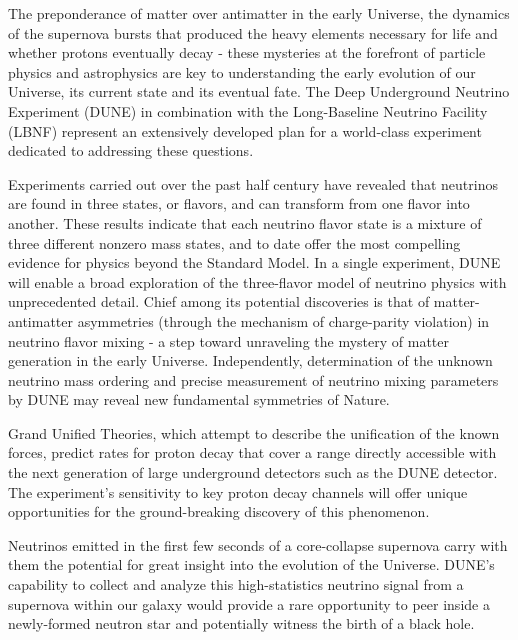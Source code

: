 



The preponderance of matter over antimatter in the early Universe, the dynamics of the supernova bursts that produced the heavy elements necessary for life and whether protons eventually decay - these mysteries at the forefront of particle physics and astrophysics are key to understanding the early evolution of our Universe, its current state and its eventual fate. The Deep Underground Neutrino Experiment (DUNE)
in combination with the Long-Baseline Neutrino Facility (LBNF) represent an extensively developed plan for a world-class experiment dedicated to addressing these questions.

Experiments carried out over the past half century have revealed that neutrinos are found in three states, or flavors, and can transform from one flavor into another. These results indicate that each neutrino flavor state is a mixture of three different nonzero mass states, and to date offer the most compelling evidence for physics beyond the Standard Model. In a single experiment, DUNE will enable a broad exploration of the three-flavor model of neutrino physics with unprecedented detail. Chief among its potential discoveries is that of matter-antimatter asymmetries (through the mechanism of charge-parity violation) in neutrino flavor mixing - a step toward unraveling the mystery of matter generation in the early Universe. Independently, determination of the unknown neutrino mass ordering and precise measurement of neutrino mixing parameters by DUNE may reveal new fundamental symmetries of Nature.

Grand Unified Theories, which attempt to describe the unification of the known forces, predict rates for proton decay that cover a range directly accessible with the next generation of large underground detectors such as the DUNE detector. The experiment's sensitivity to key proton decay channels will offer unique opportunities for the ground-breaking discovery of this phenomenon.

Neutrinos emitted in the first few seconds of a core-collapse supernova carry with them the potential for great insight into the evolution of the Universe. DUNE's capability to collect and analyze this high-statistics neutrino signal from a supernova within our galaxy would provide a rare opportunity to peer inside a newly-formed neutron star and potentially witness the birth of a black hole.

